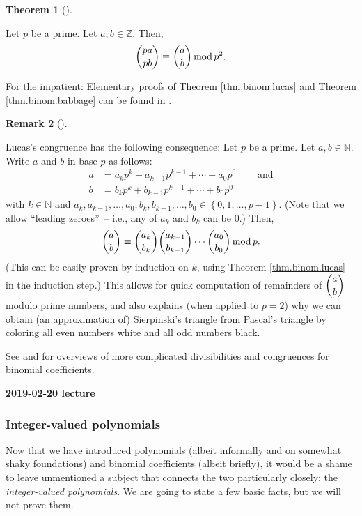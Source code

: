 \documentclass[numbers=enddot,12pt,final,onecolumn,notitlepage]{scrartcl}%
\numberwithin{exer}{subsection}
\theoremstyle{definition}
\newtheorem{theo}{Theorem}[subsection]
\newenvironment{theorem}[1][]
{\begin{theo}[#1]\begin{leftbar}}
{\end{leftbar}\end{theo}}
\newtheorem{remk}[theo]{Remark}
\newenvironment{remark}[1][]
{\begin{remk}[#1]\begin{leftbar}}
{\end{leftbar}\end{remk}}
\begin{document}
\begin{theorem}
[Babbage's congruence]\label{thm.binom.babbage}Let $p$ be a prime. Let
$a,b\in\mathbb{Z}$. Then,%
\[
\dbinom{pa}{pb}\equiv\dbinom{a}{b}\operatorname{mod}p^{2}.
\]

\end{theorem}

For the impatient: Elementary proofs of Theorem \ref{thm.binom.lucas} and
Theorem \ref{thm.binom.babbage} can be found in \cite{lucas}.

\begin{remark}
Lucas's congruence has the following consequence: Let $p$ be a prime. Let
$a,b\in\mathbb{N}$. Write $a$ and $b$ in base $p$ as follows:%
\begin{align*}
a  &  =a_{k}p^{k}+a_{k-1}p^{k-1}+\cdots+a_{0}p^{0}%
\ \ \ \ \ \ \ \ \ \ \text{and}\\
b  &  =b_{k}p^{k}+b_{k-1}p^{k-1}+\cdots+b_{0}p^{0}%
\end{align*}
with $k\in\mathbb{N}$ and $a_{k},a_{k-1},\ldots,a_{0},b_{k},b_{k-1}%
,\ldots,b_{0}\in\left\{  0,1,\ldots,p-1\right\}  $. (Note that we allow
\textquotedblleft leading zeroes\textquotedblright\ -- i.e., any of $a_{k}$
and $b_{k}$ can be $0$.) Then,%
\[
\dbinom{a}{b}\equiv\dbinom{a_{k}}{b_{k}}\dbinom{a_{k-1}}{b_{k-1}}\cdots
\dbinom{a_{0}}{b_{0}}\operatorname{mod}p.
\]
(This can be easily proven by induction on $k$, using Theorem
\ref{thm.binom.lucas} in the induction step.) This allows for quick
computation of remainders of $\dbinom{a}{b}$ modulo prime numbers, and also
explains (when applied to $p=2$) why
\href{https://en.wikipedia.org/wiki/Sierpinski_triangle#Pascal's_triangle}{we
can obtain (an approximation of) Sierpinski's triangle from Pascal's triangle
by coloring all even numbers white and all odd numbers black}.
\end{remark}

See \cite{Mestro14} and \cite{Granvi05} for overviews of more complicated
divisibilities and congruences for binomial coefficients.

\begin{center}
\textbf{2019-02-20 lecture}
\end{center}

\subsubsection{Integer-valued polynomials}

Now that we have introduced polynomials (albeit informally and on somewhat
shaky foundations) and binomial coefficients (albeit briefly), it would be a
shame to leave unmentioned a subject that connects the two particularly
closely: the \textit{integer-valued polynomials}. We are going to state a few
basic facts, but we will not prove them.
\end{document}

